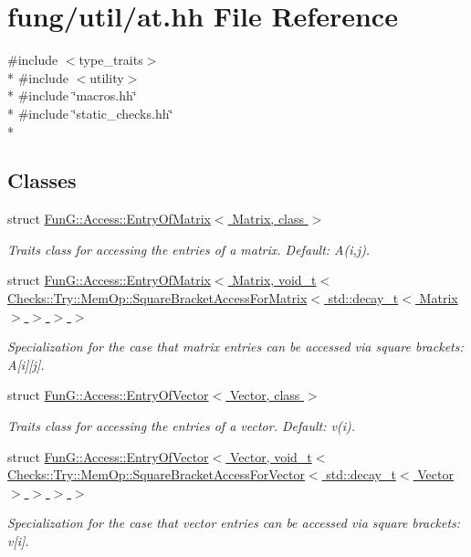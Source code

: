 \hypertarget{at_8hh}{\section{fung/util/at.hh File Reference}
\label{at_8hh}
}
{\ttfamily \#include $<$type\-\_\-traits$>$}\\*
{\ttfamily \#include $<$utility$>$}\\*
{\ttfamily \#include \char`\"{}macros.\-hh\char`\"{}}\\*
{\ttfamily \#include \char`\"{}static\-\_\-checks.\-hh\char`\"{}}\\*
\subsection*{Classes}
\begin{DoxyCompactItemize}
\item 
struct \hyperlink{structFunG_1_1Access_1_1EntryOfMatrix}{Fun\-G\-::\-Access\-::\-Entry\-Of\-Matrix$<$ Matrix, class $>$}
\begin{DoxyCompactList}\small\item\em Traits class for accessing the entries of a matrix. Default\-: A(i,j). \end{DoxyCompactList}\item 
struct \hyperlink{structFunG_1_1Access_1_1EntryOfMatrix_3_01Matrix_00_01void__t_3_01Checks_1_1Try_1_1MemOp_1_1Squa64f8314119f1d5e2cd3b3016365cec8d}{Fun\-G\-::\-Access\-::\-Entry\-Of\-Matrix$<$ Matrix, void\-\_\-t$<$ Checks\-::\-Try\-::\-Mem\-Op\-::\-Square\-Bracket\-Access\-For\-Matrix$<$ std\-::decay\-\_\-t$<$ Matrix $>$ $>$ $>$ $>$}
\begin{DoxyCompactList}\small\item\em Specialization for the case that matrix entries can be accessed via square brackets\-: A\mbox{[}i\mbox{]}\mbox{[}j\mbox{]}. \end{DoxyCompactList}\item 
struct \hyperlink{structFunG_1_1Access_1_1EntryOfVector}{Fun\-G\-::\-Access\-::\-Entry\-Of\-Vector$<$ Vector, class $>$}
\begin{DoxyCompactList}\small\item\em Traits class for accessing the entries of a vector. Default\-: v(i). \end{DoxyCompactList}\item 
struct \hyperlink{structFunG_1_1Access_1_1EntryOfVector_3_01Vector_00_01void__t_3_01Checks_1_1Try_1_1MemOp_1_1Squaa9733f1e90025a89b1e2cfa7d151d247}{Fun\-G\-::\-Access\-::\-Entry\-Of\-Vector$<$ Vector, void\-\_\-t$<$ Checks\-::\-Try\-::\-Mem\-Op\-::\-Square\-Bracket\-Access\-For\-Vector$<$ std\-::decay\-\_\-t$<$ Vector $>$ $>$ $>$ $>$}
\begin{DoxyCompactList}\small\item\em Specialization for the case that vector entries can be accessed via square brackets\-: v\mbox{[}i\mbox{]}. \end{DoxyCompactList}\end{DoxyCompactItemize}
